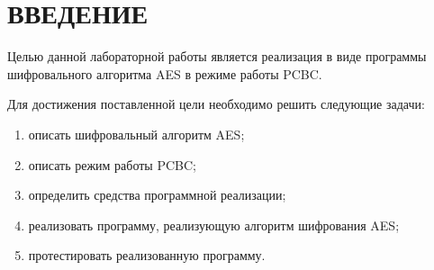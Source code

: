 \chapter*{ВВЕДЕНИЕ}

Целью данной лабораторной работы является реализация в виде программы шифровального алгоритма AES в режиме работы PCBC.

Для достижения поставленной цели необходимо решить следующие задачи:
\begin{enumerate}
	\item описать шифровальный алгоритм AES;
	\item описать режим работы PCBC;
	\item определить средства программной реализации;
	\item реализовать программу, реализующую алгоритм шифрования AES;
	\item протестировать реализованную программу.
\end{enumerate}
